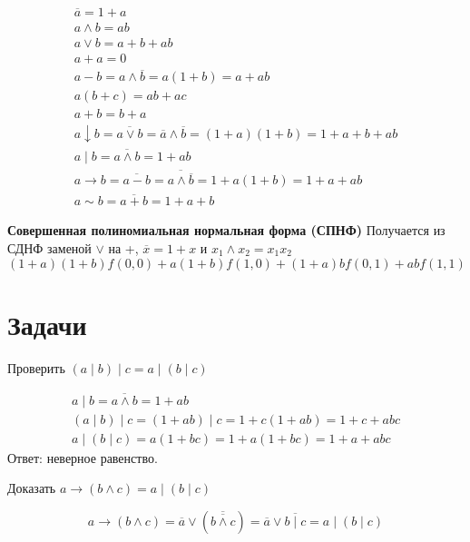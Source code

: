 \begin{gather}
    \overline a = 1 + a \\
    a \land b = ab \\
    a \lor b = a + b + ab \\
    a + a = 0 \\
    a - b = a \land \overline b = a(1 + b) = a + ab \\
    a(b + c) = ab + ac \\
    a + b = b + a \\
    a \downarrow b = \overline{a \lor b} = \overline a \land \overline b = (1 + a)(1 + b) = 1 + a + b + ab \\
    a \mid b = \overline {a \land b} = 1 + ab \\
    a \rightarrow b = \overline{a - b} = \overline{a \land \overline b} = 1 + a(1 + b) = 1 + a + ab \\
    a \sim b = \overline{a + b} = 1 + a + b
\end{gather}

\textbf{Совершенная полиномиальная нормальная форма (СПНФ)}
Получается из СДНФ заменой $\lor$ на +, $\overline x = 1 + x$ и $x_1 \land x_2 = x_1x_2$
\begin{equation}
    (1 + a)(1 + b)f(0, 0) + a(1 + b)f(1, 0) + (1 + a)bf(0, 1) + abf(1, 1)
\end{equation}

\section{Задачи}

\begin{task}
    Проверить $(a \mid b) \mid c = a \mid (b \mid c)$
    \begin{solution}
        \begin{gather*}
            a \mid b = \overline {a \land b} = 1 + ab \\
            (a \mid b) \mid c = (1 + ab) \mid c = 1 + c(1 + ab) = 1 + c + abc \\
            a \mid (b \mid c) = a(1 + bc) = 1 + a(1 + bc) = 1 + a + abc
        \end{gather*}
        Ответ: неверное равенство.
    \end{solution}
\end{task}

\begin{task}
    Доказать $a \rightarrow (b \land c) = a \mid (b \mid c)$
    \begin{solution}
        \begin{equation*}
            a \rightarrow (b \land c) = \overline a \lor (\overline{\overline{b \land c}}) = \overline a \lor \overline{b \mid c} = a \mid (b \mid c)
        \end{equation*}
    \end{solution}
\end{task}

